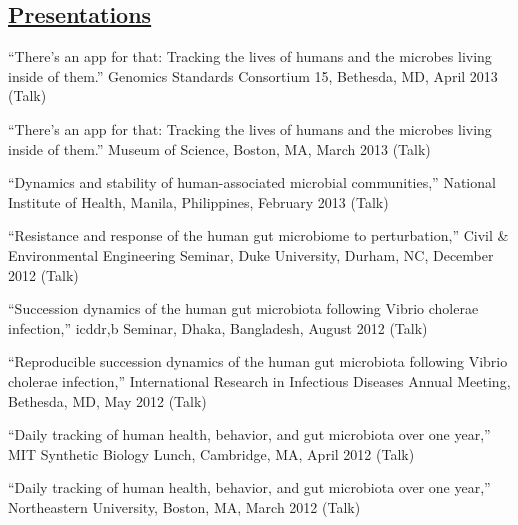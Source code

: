 \documentclass[overlapped,line,11pt]{res}
\begin{document}
\begin{resume}
\section{\underline{\sc Presentations}}
\vspace{.25in}

\begin{revnumerate}[19]

\item {``There's an app for that: Tracking the lives of humans and the
  microbes living inside of them.'' Genomics Standards Consortium 15,
  Bethesda, MD, April 2013 (Talk)}
\vspace*{1mm}

\item {``There's an app for that: Tracking the lives of humans and
  the microbes living inside of them.'' Museum of Science, Boston,
  MA, March 2013 (Talk)}
\vspace*{1mm}

\item {``Dynamics and stability of human-associated microbial
  communities,'' National Institute of Health, Manila,
  Philippines, February 2013 (Talk)}
\vspace*{1mm}

\item {``Resistance and response of the human gut microbiome to
  perturbation,'' Civil \& Environmental Engineering Seminar, Duke University,
  Durham, NC, December 2012 (Talk)}

\item {``Succession dynamics of the human gut microbiota
  following Vibrio cholerae infection,'' icddr,b Seminar, Dhaka,
  Bangladesh, August 2012 (Talk)}
\vspace*{1mm}

\item {``Reproducible succession dynamics of the human gut microbiota
  following Vibrio cholerae infection,'' International Research in
  Infectious Diseases Annual Meeting, Bethesda, MD, May 2012 (Talk)}
\vspace*{1mm}

\item {``Daily tracking of human health, behavior, and gut microbiota
  over one year,'' MIT Synthetic Biology Lunch, Cambridge, MA, April 2012 (Talk)}
\vspace*{1mm}

\item {``Daily tracking of human health, behavior, and gut microbiota
  over one year,'' Northeastern University, Boston, MA, March 2012 (Talk)}
\vspace*{1mm}


\end{revnumerate}
\end{resume}
\end{document}
